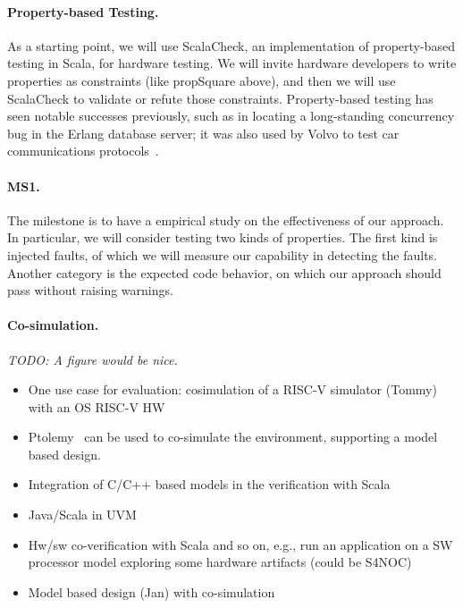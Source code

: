 \documentclass[fleqn,12pt]{article}
\newcommand{\todo}[1]{{\it TODO: #1}}
\begin{document}
\paragraph{Property-based Testing.}
As a starting point, we will use ScalaCheck, an implementation of
property-based testing in Scala, for hardware testing. We will invite
hardware developers to write properties as constraints (like
propSquare above), and then we will use ScalaCheck to validate or
refute those constraints. Property-based testing has seen notable
successes previously, such as in locating a long-standing concurrency bug
in the Erlang database server; it was also used by Volvo to test car
communications protocols~\cite{DBLP:conf/icse/HughesNSA16}.

\paragraph{MS1.} The milestone is to have a empirical study on the effectiveness of our approach. In particular,  we will consider testing  two kinds of properties. The first kind is injected faults, of which we will measure our capability in detecting the faults. Another category is the expected code behavior, on which our approach should  pass without raising  warnings. 

\paragraph{Co-simulation.}

\todo{A figure would be nice.}

\begin{itemize}
\item One use case for evaluation: cosimulation of a RISC-V simulator (Tommy) with an OS RISC-V HW 
\item Ptolemy~\cite{ptolemyII-book} can be used to co-simulate the environment, supporting a model based design.
\item Integration of C/C++ based models in the verification with Scala
\item Java/Scala in UVM
\item Hw/sw co-verification with Scala and so on, e.g., run an application on a SW processor model exploring some hardware artifacts (could be S4NOC)
\item Model based design (Jan) with co-simulation
\end{itemize}
\end{document}
